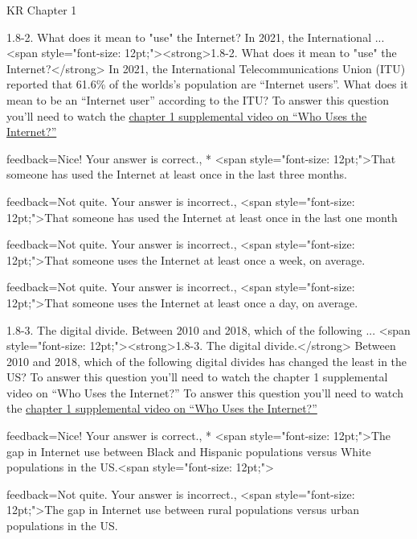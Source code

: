 \documentclass[a4paper]{article}
\begin{document}
\begin{quiz}{KR Chapter 1}
\begin{multi}[
	points=1,
	penalty=0.33333,
]{1.8-2. What does it mean to "use" the Internet? In 2021, the International ...}
<span style="font-size: 12pt;"><strong>1.8-2. What does it mean to "use" the Internet?</strong> In 2021, the International Telecommunications Union (ITU) reported that 61.6\% of the worlds’s population are “Internet users”.  What does it mean to be an “Internet user” according to the ITU? To answer this question you’ll need to watch the \href{https://www.youtube.com/watch?v=-YaGGf8C1A4}{chapter 1 supplemental video on “Who Uses  the Internet?”}
\item[feedback={Nice!  Your answer is correct.},]* <span style="font-size: 12pt;">That someone has used the Internet at least once in the last three months.
\item[feedback={Not quite.  Your answer is incorrect.},] <span style="font-size: 12pt;">That someone has used the Internet at least once in the last one month
\item[feedback={Not quite.  Your answer is incorrect.},] <span style="font-size: 12pt;">That someone uses the Internet at least once a week, on average.
\item[feedback={Not quite.  Your answer is incorrect.},] <span style="font-size: 12pt;">That someone uses the Internet at least once a day, on average.
\end{multi}

\begin{multi}[
	points=1,
	penalty=0.33333,
]{1.8-3.  The digital divide. Between 2010 and 2018, which of the following ...}
<span style="font-size: 12pt;"><strong>1.8-3.  The digital divide.</strong> Between 2010 and 2018, which of the following digital divides has changed the least in the US? To answer this question you’ll need to watch the chapter 1 supplemental video on “Who Uses  the Internet?” To answer this question you’ll need to watch the \href{https://www.youtube.com/watch?v=-YaGGf8C1A4}{chapter 1 supplemental video on “Who Uses  the Internet?”}
\item[feedback={Nice!  Your answer is correct.},]* <span style="font-size: 12pt;">The gap in Internet use between Black and Hispanic populations versus White populations in the US.<span style="font-size: 12pt;">
\item[feedback={Not quite.  Your answer is incorrect.},] <span style="font-size: 12pt;">The gap in Internet use between rural populations versus urban populations in the US.
\end{multi}


\end{quiz}
\end{document}
